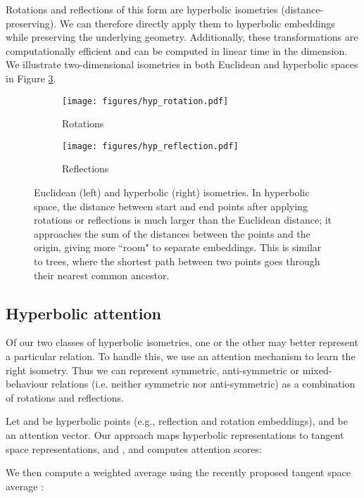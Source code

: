 \documentclass[11pt,a4paper]{article}
\begin{document}
Rotations and reflections of this form are hyperbolic isometries (distance-preserving).  
We can therefore directly apply them to hyperbolic embeddings while preserving the underlying geometry.  
Additionally, these transformations are computationally efficient and can be computed in linear time in the dimension.
We illustrate two-dimensional isometries in both Euclidean and hyperbolic spaces in Figure \ref{fig:isometries}.  \begin{figure}
\centering
\begin{subfigure}[b]{0.49\textwidth}
        \texttt{[image: figures/hyp\_rotation.pdf]}
        \caption{Rotations}
        \label{fig:rotations}
    \end{subfigure}
    \begin{subfigure}[b]{0.49\textwidth}
        \texttt{[image: figures/hyp\_reflection.pdf]}
        \caption{Reflections}
        \label{fig:reflections}
    \end{subfigure}
\caption{Euclidean (left) and hyperbolic (right) isometries. 
In hyperbolic space, the distance between start and end points after applying rotations or reflections is much larger than the Euclidean distance; it approaches the sum of the distances between the points and the origin, giving more ``room" to separate embeddings. This is similar to trees, where the shortest path between two points goes through their nearest common ancestor. 
}\label{fig:isometries}
\end{figure} 
 
\subsection{Hyperbolic attention}\label{subsec:attention}
Of our two classes of hyperbolic isometries, one or the other may better represent a particular relation. 
To handle this, we use an attention mechanism to learn the right isometry. 
Thus we can represent symmetric, anti-symmetric or mixed-behaviour relations (i.e. neither symmetric nor anti-symmetric) as a combination of rotations and reflections.

Let  and  be hyperbolic points (e.g., reflection and rotation embeddings), and  be an attention vector. Our approach maps hyperbolic representations to tangent space representations,  and , and computes attention scores:

We then compute a weighted average using the recently proposed tangent space average \cite{chami2019hyperbolic,liu2019hyperbolic}: 
\end{document}
